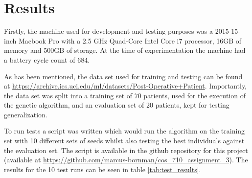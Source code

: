 \section{Results}
Firstly, the machine used for development and testing purposes was a 2015 15-inch Macbook Pro with a 2.5 GHz Quad-Core Intel Core i7 processor, 16GB of memory and 500GB of storage. At the time of experimentation the machine had a battery cycle count of 684.

As has been mentioned, the data set used for training and testing can be found at \url{https://archive.ics.uci.edu/ml/datasets/Post-Operative+Patient}. Importantly, the data set was split into a training set of 70 patients, used for the execution of the genetic algorithm, and an evaluation set of 20 patients, kept for testing generalization.

To run tests a script was written which would run the algorithm on the training set with 10 different sets of seeds whilst also testing the best individuals against the evaluation set. The script is available in the github repository for this project (available at \url{https://github.com/marcus-bornman/cos_710_assignment_3}). The results for the 10 test runs can be seen in table \ref{tab:test_results}.

